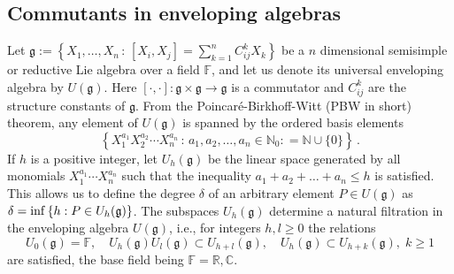 \documentclass[10pt]{amsart}
\theoremstyle{definition}
\theoremstyle{corollary}
\theoremstyle{remark}
\theoremstyle{conclusion}
\begin{document}
\subsection{Commutants in enveloping algebras}
\label{subsec2.1}
 Let $\mathfrak{g}:=\left\{X_1, \dots, X_n \, :\, [X_i,X_j]= \sum_{k=1}^nC_{ij}^k X_k\right\}$ be a $n$ dimensional semisimple or reductive Lie algebra over a field $\mathbb{F}$, and let us denote its universal enveloping algebra by $U(\mathfrak{g})$. Here $[\cdot,\cdot]: \mathfrak{g} \times \mathfrak{g} \rightarrow \mathfrak{g}$ is a commutator and $C_{ij}^k$  are the structure constants of $\mathfrak{g}$. From the Poincar\'e-Birkhoff-Witt (PBW in short) theorem, any element of $U(\mathfrak{g})$ is spanned by the ordered basis elements
\begin{equation}
	\left\{X_1^{a_1}X_2^{a_2}\cdots X_n^{a_n} \, : \, a_1, a_2, \dots, a_n \in \mathbb{N}_{0} : = \mathbb{N} \cup \{0\}\right\} \, .
\end{equation}
If $h$ is a positive integer, let $U_h(\mathfrak{g})$ be the linear space generated by all monomials $X_1^{a_1}\cdots X_n^{a_n}$ such that the inequality $a_1+a_2+\ldots +a_n\leq h$ is satisfied. This allows us to define the degree $\delta$ of an arbitrary element $P\in U(\mathfrak{g})$ as $\delta={\rm inf}\left\{ h : P\in U_h(\mathfrak{g})\right\}$. The subspaces $U_h(\mathfrak{g})$ determine a natural filtration in the enveloping algebra $U(\mathfrak{g})$, i.e., for integers $h,l\geq 0$ the relations  
\begin{equation}
	U_0(\mathfrak{g})=\mathbb{F},\quad U_{h}(\mathfrak{g})U_l(\mathfrak{g})\subset U_{h+l}(\mathfrak{g}),\quad U_{h}(\mathfrak{g})\subset U_{h+k}(\mathfrak{g}),\; k\geq 1 \label{fil1}
\end{equation}
are satisfied, the base field being $\mathbb{F}=\mathbb{R,C}$.  
\end{document}

